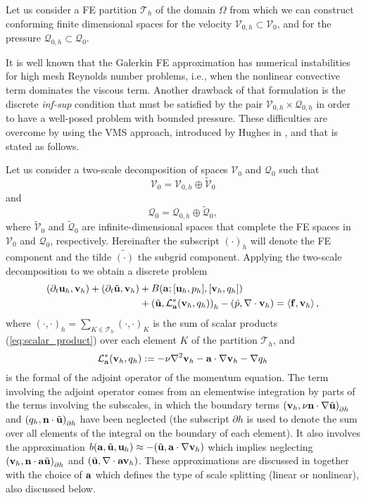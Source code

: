 Let us consider a FE partition $\mathcal{T}_h$ of the domain $\Omega$ from which we can construct conforming finite dimensional spaces for the velocity $\mathcal{V}_{0,h} \subset \mathcal{V}_0$, and for the pressure $\mathcal{Q}_{0,h}\subset \mathcal{Q}_0$. 

It is well known that the Galerkin FE approximation  has numerical instabilities for high mesh Reynolds number problems, i.e., when the nonlinear convective term dominates the viscous term. Another drawback of that formulation is the discrete \textit{inf-sup} condition that must be satisfied by the pair $\mathcal{V}_{0,h} \times\mathcal{Q}_{0,h}$ in order to have a well-posed problem with bounded pressure. These difficulties are overcome by using the VMS approach, introduced by Hughes in \cite{hughes,hughes}, and that is stated as follows.

Let us consider a two-scale decomposition of spaces $\mathcal{V}_0$ and $\mathcal{Q}_0$ such that $$\mathcal{V}_0=\mathcal{V}_{0,h}\oplus\widetilde{\mathcal{V}}_0$$ and $$\mathcal{Q}_0=\mathcal{Q}_{0,h}\oplus\widetilde{\mathcal{Q}}_0,$$ where $\widetilde{\mathcal{V}}_0$ and $\widetilde{\mathcal{Q}}_0$ are infinite-dimensional spaces that complete the FE spaces in $\mathcal{V}_0$ and $\mathcal{Q}_0$, respectively. Hereinafter the subscript $(\cdot)_h$ will denote the FE component and the tilde $\widetilde{(\cdot)}$ the subgrid component. Applying the two-scale decomposition to  we obtain a discrete problem
\begin{align}
\label{eq-C2_NS_discrete}
(\partial_t{\bf u}_h,{\bf v}_h)+(\partial_t\tilde{{\bf u}},{\bf v}_h)&+B({\bf a};[{\bf u}_h,p_h],[{\bf v}_h,q_h])\\\nonumber
&+\left(\tilde{{\bf u}},\mathcal{L}_{{\bf a}}^*({\bf v}_h,q_h)\right)_h-\left(\tilde{p},\nabla\cdot{\bf v}_h\right)=\left<{\bf f},{\bf v}_h\right>,
\end{align}
where $(\cdot,\cdot)_h=\sum_{K\in\mathcal{T}_h}(\cdot,\cdot)_K$ is the sum of scalar products (\ref{eq:scalar_product}) over each element $K$ of the partition $\mathcal{T}_h$, and
\begin{equation}
\label{eq-C2_adjoint}
\mathcal{L}_{{\bf a}}^*({\bf v}_h,q_h):=-\nu\nabla^2{\bf v}_h-{\bf a}\cdot\nabla{\bf v}_h-\nabla q_h
\end{equation}
is the formal of the adjoint operator of the momentum equation. The term involving the adjoint operator comes from an elementwise integration by parts of the terms involving the subscales, in which the boundary terms 
$\left( {\bf v}_{h},\nu {\bf n}\cdot \nabla \tilde{{\bf u}}\right)_{\partial h}$ and
$\left( q_{h},{\bf n}\cdot \tilde{{\bf u}}\right)_{\partial h}$
have been neglected (the subscript ${\partial h}$ is used to denote the sum over all elements of the integral on the boundary of each element). It also involves the approximation 
$b({\bf a},\tilde{{\bf u}},{\bf u}_h) \approx -(\tilde{{\bf u}},{\bf a}\cdot\nabla{\bf v}_h)$
which implies neglecting 
$\left( {\bf v}_{h},{\bf n}\cdot {\bf a} \tilde{{\bf u}}\right)_{\partial h}$ and
$(\tilde{{\bf u}},\nabla\cdot{\bf a}{\bf v}_h)$. 
These approximations are discussed in  \cite{codina_time_2007} together with the choice of ${\bf a}$ which defines the type of scale splitting (linear or nonlinear), also discussed below.


